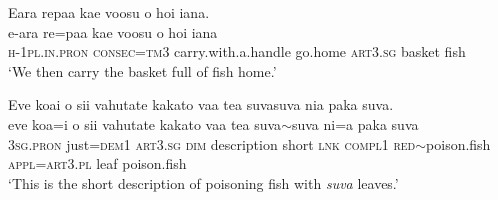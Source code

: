 \ea\label{ex:text29-17}
Eara repaa kae voosu o hoi iana.\\
\gll e-ara	re=paa	kae	voosu	o	hoi	iana\\
     \textsc{h}-1\textsc{pl}.\textsc{in}.\textsc{pron}	\textsc{consec}=\textsc{tm}3	carry.with.a.handle	go.home	\textsc{art}3.\textsc{sg}	basket	fish\\
\glt `We then carry the basket full of fish home.'
\z

\ea\label{ex:text29-18}
Eve koai o sii vahutate kakato vaa tea suvasuva nia paka suva.\\
\gll eve	koa=i	o	sii	vahutate	kakato	vaa	tea	suva{$\sim$}suva	ni=a	paka	suva\\
     3\textsc{sg}.\textsc{pron}	just=\textsc{dem}1	\textsc{art}3.\textsc{sg}	\textsc{dim}	description	short	\textsc{lnk}	\textsc{compl}1	\textsc{red}{$\sim$}poison.fish	\textsc{appl}=\textsc{art}3.\textsc{pl}	leaf	poison.fish\\
\glt `This is the short description of poisoning fish with \textit{suva} leaves.'
\z
